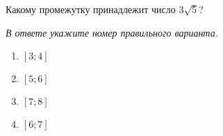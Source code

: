 Какому промежутку принадлежит число $3\sqrt{5}$?

\textit{В ответе укажите номер правильного варианта.}
\begin{multicols}{4}
	\begin{enumerate}[label=\arabic*)]
		\item $[3;4]$
		\item $[5;6]$
		\item $[7;8]$
		\item $[6;7]$
	\end{enumerate}
\end{multicols}
